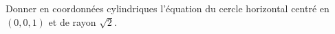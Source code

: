 
\begin{exercice}\label{exoOutilsMath-0049}

    Donner en coordonnées cylindriques l'équation du cercle horizontal centré en $(0,0,1)$ et de rayon $\sqrt{2}$.

\end{exercice}
